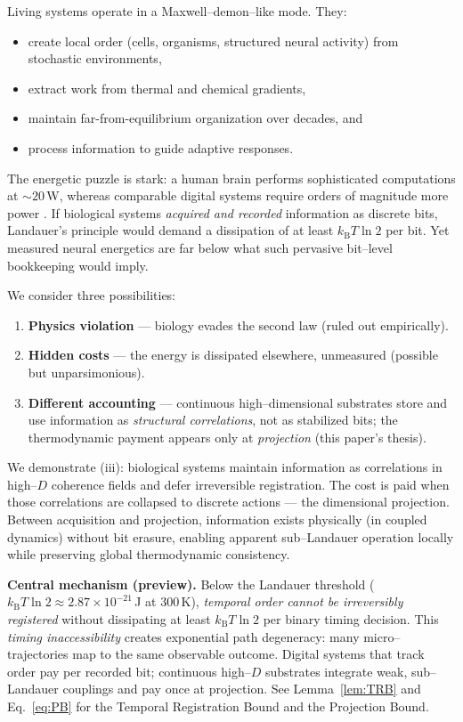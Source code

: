 \documentclass[12pt]{article}
\numberwithin{equation}{section}
\newcommand{\kB}{k_{\mathrm{B}}}
\begin{document}
Living systems operate in a Maxwell--demon--like mode. They:
\begin{itemize}
\item create local order (cells, organisms, structured neural activity) from stochastic environments,
\item extract work from thermal and chemical gradients,
\item maintain far-from-equilibrium organization over decades, and
\item process information to guide adaptive responses.
\end{itemize}

\noindent The energetic puzzle is stark: a human brain performs sophisticated computations at $\sim\!20$\,W, whereas comparable digital systems require orders of magnitude more power \cite{horowitz2014}. If biological systems \emph{acquired and recorded} information as discrete bits, Landauer's principle would demand a dissipation of at least $\kB T\ln 2$ per bit. Yet measured neural energetics are far below what such pervasive bit--level bookkeeping would imply.

We consider three possibilities:
\begin{enumerate}
\item \textbf{Physics violation} --- biology evades the second law (ruled out empirically).
\item \textbf{Hidden costs} --- the energy is dissipated elsewhere, unmeasured (possible but unparsimonious).
\item \textbf{Different accounting} --- continuous high--dimensional substrates store and use information as \emph{structural correlations}, not as stabilized bits; the thermodynamic payment appears only at \emph{projection} (this paper's thesis).
\end{enumerate}

We demonstrate (iii): biological systems maintain information as correlations in high--$D$ coherence fields and defer irreversible registration. The cost is paid when those correlations are collapsed to discrete actions --- the dimensional projection. Between acquisition and projection, information exists physically (in coupled dynamics) without bit erasure, enabling apparent sub--Landauer operation locally while preserving global thermodynamic consistency.

\textbf{Central mechanism (preview).} Below the Landauer threshold ($\kB T\ln 2 \approx 2.87\times10^{-21}$\,J at 300\,K), \emph{temporal order cannot be irreversibly registered} without dissipating at least $\kB T\ln 2$ per binary timing decision. This \emph{timing inaccessibility} creates exponential path degeneracy: many micro--trajectories map to the same observable outcome. Digital systems that track order pay per recorded bit; continuous high--$D$ substrates integrate weak, sub--Landauer couplings and pay once at projection. See Lemma~\ref{lem:TRB} and Eq.~\ref{eq:PB} for the Temporal Registration Bound and the Projection Bound.
\end{document}
